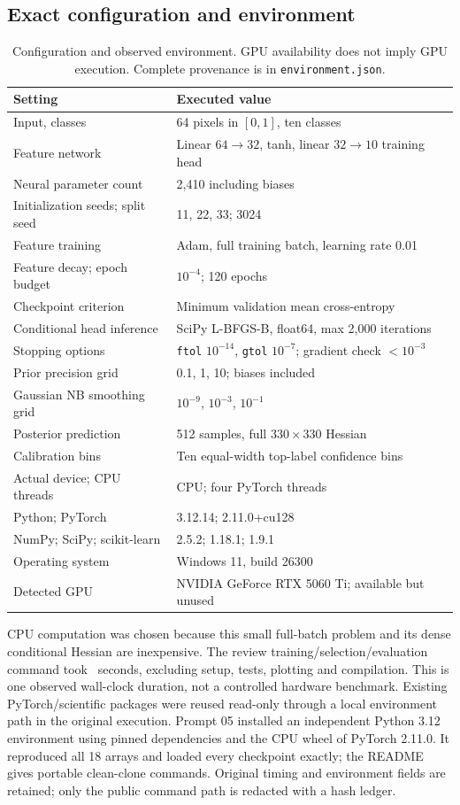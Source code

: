 \documentclass[10pt,a4paper]{article}
\begin{document}
\subsection{Exact configuration and environment}
\begin{table}[H]\centering
\begin{tabularx}{\linewidth}{p{57mm}X}
\toprule Setting & Executed value\\\midrule
Input, classes & 64 pixels in $[0,1]$, ten classes\\
Feature network & Linear $64\rightarrow32$, tanh, linear $32\rightarrow10$ training head\\
Neural parameter count & 2,410 including biases\\
Initialization seeds; split seed & 11, 22, 33; 3024\\
Feature training & Adam, full training batch, learning rate 0.01\\
Feature decay; epoch budget & $10^{-4}$; 120 epochs\\
Checkpoint criterion & Minimum validation mean cross-entropy\\
Conditional head inference & SciPy L-BFGS-B, float64, max 2,000 iterations\\
Stopping options & \texttt{ftol} $10^{-14}$, \texttt{gtol} $10^{-7}$; gradient check $<10^{-3}$\\
Prior precision grid & 0.1, 1, 10; biases included\\
Gaussian NB smoothing grid & $10^{-9}$, $10^{-3}$, $10^{-1}$\\
Posterior prediction & 512 samples, full $330\times330$ Hessian\\
Calibration bins & Ten equal-width top-label confidence bins\\
Actual device; CPU threads & CPU; four PyTorch threads\\
Python; PyTorch & 3.12.14; 2.11.0+cu128\\
NumPy; SciPy; scikit-learn & 2.5.2; 1.18.1; 1.9.1\\
Operating system & Windows 11, build 26300\\
Detected GPU & NVIDIA GeForce RTX 5060 Ti; available but unused\\
\bottomrule\end{tabularx}
\caption{Configuration and observed environment. GPU availability does not
imply GPU execution. Complete provenance is in \texttt{environment.json}.}
\end{table}
CPU computation was chosen because this small full-batch problem and its dense
conditional Hessian are inexpensive. The review training/selection/evaluation
command took \RunSeconds\ seconds, excluding setup, tests, plotting and
compilation. This is one observed wall-clock duration, not a controlled hardware
benchmark. Existing PyTorch/scientific packages were reused read-only through
a local environment path in the original execution. Prompt 05 installed an
independent Python 3.12 environment using pinned dependencies and the CPU wheel
of PyTorch 2.11.0. It reproduced all 18 arrays and loaded every checkpoint exactly;
the README gives portable clean-clone commands. Original timing and environment
fields are retained; only the public command path is redacted with a hash ledger.
\end{document}
